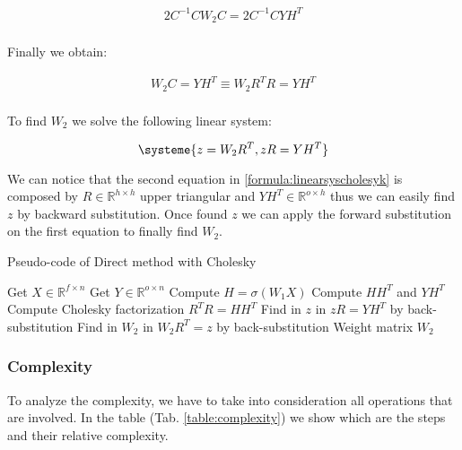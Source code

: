 \begin{equation}
    \begin{aligned}
        2C^{-1}CW_2C = 2C^{-1}CYH^T \\
    \end{aligned}
\end{equation}

Finally we obtain:

\begin{equation}
    \begin{aligned}
        W_2C = YH^T \equiv W_2R^TR = YH^T \\
    \end{aligned}
\end{equation}

To find $W_2$ we solve the following linear system:

\begin{equation}
\label{formula:linearsyscholesyk}
\systeme{z = W_2R^T, zR = YH^T}
\end{equation}


We can notice that the second equation in \ref{formula:linearsyscholesyk} is composed by $R \in \mathbb{R}^{h \times h} $  upper triangular and $YH^T \in \mathbb{R}^{o \times h}$ thus we can easily find $z$ by backward substitution. 
Once found $z$ we can apply the forward substitution on the first equation to finally find $W_2$.


\begin{algorithm}
    \caption{Pseudo-code of Direct method with Cholesky}
    \label{alg:code_cholesky}
    \begin{algorithmic}[1]
        \STATE Get $X \in \mathbb{R}^{f \times n}$
        \STATE Get $Y \in \mathbb{R}^{o \times n}$
        \STATE Compute $H = \sigma(W_1X)$
        \STATE Compute $HH^T$ and $YH^T$
        \STATE Compute Cholesky factorization $R^TR = HH^T$
        \STATE Find in $z$ in $zR = YH^T$ by back-substitution
        \STATE Find in $W_2$ in $W_2R^T = z$ by back-substitution
        \RETURN Weight matrix $W_2$
    \end{algorithmic}
\end{algorithm}


\subsubsection{Complexity}
To analyze the complexity, we have to take into consideration all operations that are involved. In the table (Tab. \ref{table:complexity}) we show which are the steps and their relative complexity.

